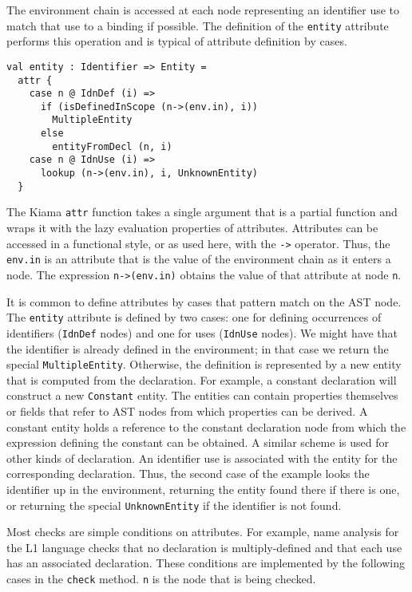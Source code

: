 The environment chain is accessed at each node representing an identifier use to match that use to a binding if possible.
The definition of the \verb|entity| attribute performs this operation and is typical of attribute definition by cases.

\begin{verbatim}
val entity : Identifier => Entity =
  attr {
    case n @ IdnDef (i) =>
      if (isDefinedInScope (n->(env.in), i))
        MultipleEntity
      else
        entityFromDecl (n, i)
    case n @ IdnUse (i) =>
      lookup (n->(env.in), i, UnknownEntity)
  }
\end{verbatim}

\noindent
The Kiama \verb|attr| function takes a single argument that is a partial function and wraps it with the lazy evaluation properties of attributes.
Attributes can be accessed in a functional style, or as used here, with the \verb|->| operator.
Thus, the \verb|env.in| is an attribute that is the value of the environment chain as it enters a node.
The expression \verb|n->(env.in)| obtains the value of that attribute at node \verb|n|.

It is common to define attributes by cases that pattern match on the AST node.
The \verb|entity| attribute is defined by two cases: one for defining occurrences of identifiers (\verb|IdnDef| nodes) and one for uses (\verb|IdnUse| nodes).
We might have that the identifier is already defined in the environment; in that case we return the special \verb|MultipleEntity|.
Otherwise, the definition is represented by a new entity that is computed from the declaration.
For example, a constant declaration will construct a new \verb|Constant| entity.
The entities can contain properties themselves or fields that refer to AST nodes from which properties can be derived.
A constant entity holds a reference to the constant declaration node from which the expression defining the constant can be obtained.
A similar scheme is used for other kinds of declaration.
An identifier use is associated with the entity for the corresponding declaration.
Thus, the second case of the example looks the identifier up in the environment, returning the entity found there if there is one, or returning the special \verb|UnknownEntity| if the identifier is not found.

Most checks are simple conditions on attributes.
For example, name analysis for the L1 language checks that no declaration is multiply-defined and that each use has an associated declaration.
These conditions are implemented by the following cases in the \verb|check| method. 
\verb|n| is the node that is being checked.


